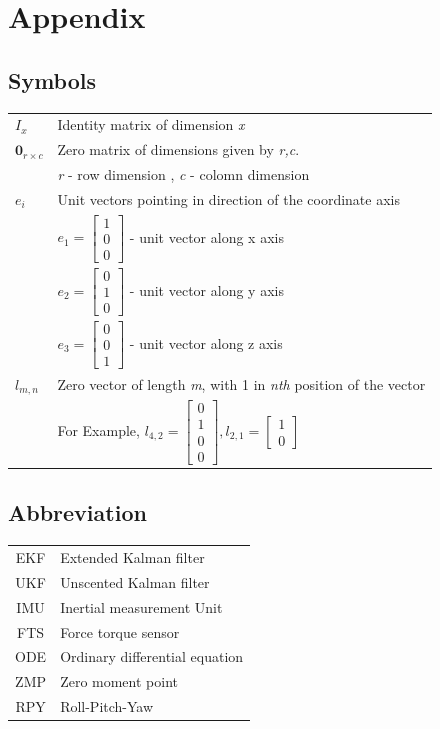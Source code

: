\chapter{Appendix}
\section{Symbols}
\label{sec:symbols}
\begin{tabular}{p{2cm} l}
$I_{x}$ & Identity matrix of dimension \emph{x} \\
$\textbf{0}_{r \times c}$ & Zero matrix of dimensions given by \emph{r,c}. \\
						  & \emph{r} - row dimension , \emph{c} - colomn dimension \\
$e_i$ 			& Unit vectors pointing in direction of the coordinate axis  \\
				& $e_1 = \begin{bmatrix} 1 \\ 0 \\ 0 \end{bmatrix} $ - unit vector along x axis \\						& $e_2 = \begin{bmatrix} 0 \\ 1 \\ 0 \end{bmatrix} $ - unit vector along y axis \\						& $e_3 = \begin{bmatrix} 0 \\ 0 \\ 1 \end{bmatrix} $ - unit vector along z axis \\	
$l_{m,n}$    	& Zero vector of length \emph{m}, with 1 in \emph{nth} position of the vector \\
			    & For Example, $l_{4,2} = \begin{bmatrix} 0 \\ 1 \\ 0 \\ 0 \end{bmatrix}, l_{2,1} = 						\begin{bmatrix} 1 \\ 0 \end{bmatrix} $ \\		
\end{tabular}

\section{Abbreviation}
\begin{tabular}{c l}
EKF & Extended Kalman filter \\
UKF & Unscented Kalman filter \\
IMU & Inertial measurement Unit \\
FTS & Force torque sensor \\
ODE & Ordinary differential equation\\
ZMP & Zero moment point\\
RPY & Roll-Pitch-Yaw
\end{tabular}

